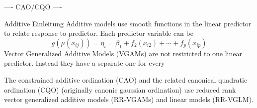  
  ---- CAO/CQO ---- %
 
  Additive Einleitung  
 	Additive models use smooth functions in the linear predictor to relate response to predictor. Each predictor variable can be 		%
 	\begin{equation}\label{GAM}
 		g(\mu(x_{ij})) = \eta_i =  \beta_1 + f_2(x_{i2}) + \cdots + f_p(x_{ip})
 	\end{equation} 
 	Vector Generalized Additive Models (VGAMs) are not restricted to one linear predictor. Instead they have a separate one for every %
 	
 
 The constrained additive ordination (CAO) \citep{Yee2006} and the related canonical quadratic ordination (CQO) (originally canonic gaussian ordination) \citep{Yee2004} use reduced rank vector generalized additive models (RR-VGAMs) and linear models (RR-VGLM). 
 
